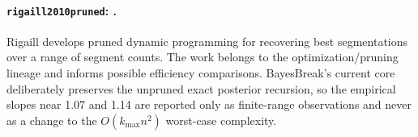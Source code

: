 
\paragraph{\texttt{rigaill2010pruned}: \citet{rigaill2010pruned}.}
Rigaill develops pruned dynamic programming for recovering best segmentations over a range of segment counts. The work belongs to the optimization/pruning lineage and informs possible efficiency comparisons. BayesBreak's current core deliberately preserves the unpruned exact posterior recursion, so the empirical slopes near 1.07 and 1.14 are reported only as finite-range observations and never as a change to the $O(k_{\max}n^2)$ worst-case complexity.
